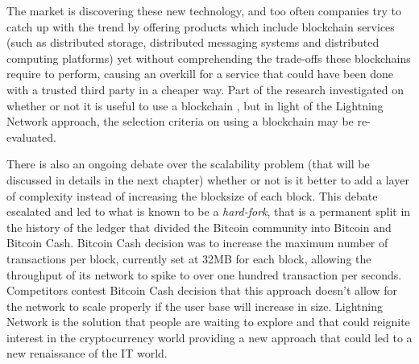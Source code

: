 		The market is discovering these new technology, and too often companies try to catch up with the trend by offering products which include blockchain services (such as distributed storage, distributed messaging systems and distributed computing platforms) yet without comprehending the trade-offs these blockchains require to perform, causing an overkill for a service that could have been done with a trusted third party in a cheaper way. Part of the research investigated on whether or not it is useful to use a blockchain \cite{Wust2017}, but in light of the Lightning Network approach, the selection criteria on using a blockchain may be re-evaluated.
		
		There is also an ongoing debate over the scalability problem (that will be discussed in details in the next chapter) whether or not is it better to add a layer of complexity instead of increasing the blocksize of each block. This debate escalated and led to what is known to be a \textit{hard-fork}, that is a  permanent split in the history of the ledger that divided the Bitcoin community into Bitcoin and Bitcoin Cash. Bitcoin Cash decision was to increase the maximum number of transactions per block, currently set at 32MB for each block, allowing the throughput of its network to spike to over one hundred transaction per seconds. Competitors contest Bitcoin Cash decision that this approach doesn't allow for the network to scale properly if the user base will increase in size. Lightning Network is the solution that people are waiting to explore and that could reignite interest in the cryptocurrency world providing a new approach that could led to a new renaissance of the IT world.
		
